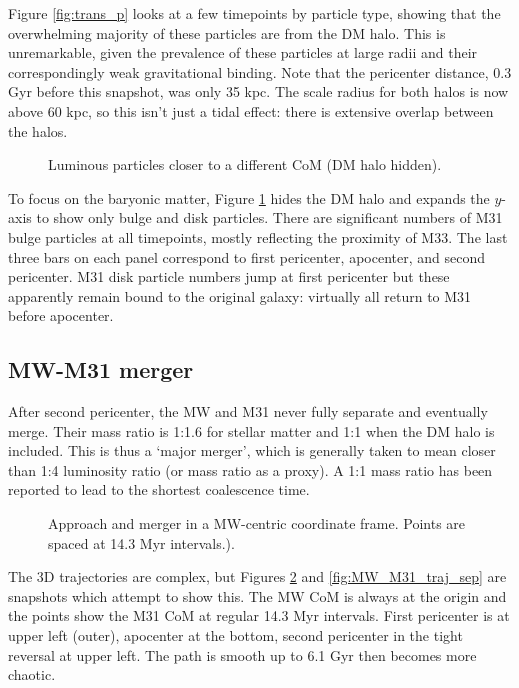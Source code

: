 \documentclass[twocolumn]{aastex63}
\begin{document}
Figure \ref{fig:trans_p} looks at a few timepoints by particle type, showing that the overwhelming majority of these particles are from the DM halo. This is unremarkable, given the prevalence of these particles at large radii and their correspondingly weak gravitational binding. Note that the pericenter distance, 0.3 Gyr before this snapshot, was only 35 kpc. The scale radius for both halos is now above 60 kpc, so this isn't just a tidal effect: there is extensive overlap between the halos.

\begin{figure}[htb!]
	\caption{Luminous particles closer to a different CoM (DM halo hidden).
		\label{fig:trans_l}}
\end{figure}

To focus on the baryonic matter, Figure \ref{fig:trans_l} hides the DM halo and expands the $y$-axis to show only bulge and disk particles. There are significant numbers of M31 bulge particles at all timepoints, mostly reflecting the proximity of M33. The last three bars on each panel correspond to first pericenter, apocenter, and second pericenter. M31 disk particle numbers jump at first pericenter but these apparently remain bound to the original galaxy: virtually all return to M31 before apocenter.


\subsection{MW-M31 merger}

After second pericenter, the MW and M31 never fully separate and eventually merge. Their mass ratio is 1:1.6 for stellar matter and 1:1 when the DM halo is included. This is thus a `major merger', which is generally taken to mean closer than 1:4 luminosity ratio (or mass ratio as a proxy). A 1:1 mass ratio has been reported \citep{boylan-kolchin_dynamical_2008, ji_lifetime_2014} to lead to the shortest coalescence time.

\begin{figure}[htb!]
	\caption{Approach and merger in a MW-centric coordinate frame. Points are spaced at 14.3 Myr intervals.).
		\label{fig:MW_M31_traj_time}}
\end{figure}

The 3D trajectories are complex, but Figures \ref{fig:MW_M31_traj_time} and \ref{fig:MW_M31_traj_sep} are snapshots which attempt to show this. The MW CoM is always at the origin and the points show the M31 CoM at regular 14.3 Myr intervals. First pericenter is at upper left (outer), apocenter at the bottom, second pericenter in the tight reversal at upper left. The path is smooth up to 6.1 Gyr then becomes more chaotic.
\end{document}

